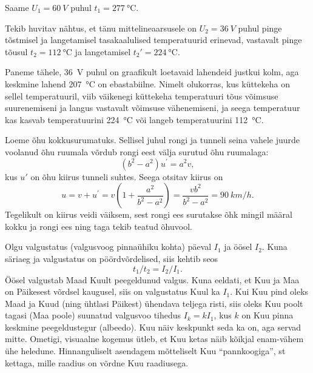 \documentclass[10pt]{article}
\begin{document}
{Saame $U_1 = \SI{60}{V}$ puhul $t_1 = \SI{277}{\degreeCelsius}$.

Tekib huvitav nähtus, et tänu mittelineaarsusele on $U_2 = \SI{36}{V}$ puhul pinge tõstmisel ja langetamisel tasakaalulised temperatuurid erinevad, vastavalt pinge tõusul $t_2 = \SI{112}{\degreeCelsius}$ ja langetamisel $t_2' = \SI{224}{\degreeCelsius}$.

Paneme tähele, \SI{36}{V} puhul on graafikult loetavaid lahendeid justkui kolm, aga keskmine lahend \SI{207}{\degreeCelsius} on ebastabiilne. Nimelt olukorras, kus küttekeha on sellel temperatuuril, viib väikenegi küttekeha temperatuuri tõus võimsuse suurenemiseni ja langus vastavalt võimsuse vähenemiseni, ja seega temperatuur kas kasvab temperatuurini \SI{224}{\degreeCelsius} või langeb temperatuurini \SI{112}{\degreeCelsius}.
\probend
\newpage
\bigskip


\solu
Loeme õhu kokkusurumatuks. Sellisel juhul rongi ja tunneli seina vahele juurde
voolanud õhu ruumala võrdub rongi eest välja surutud õhu ruumalaga:
\[
\left(b^{2}-a^{2}\right) u^{\prime}=a^{2} v,
\]
kus $u'$ on õhu kiirus tunneli suhtes. Seega otsitav kiirus on
\[
u=v+u^{\prime}=v\left(1+\frac{a^{2}}{b^{2}-a^{2}}\right)=\frac{v b^{2}}{b^{2}-a^{2}}=\SI{90}{km/h}.
\]
Tegelikult on kiirus veidi väiksem, sest rongi ees surutakse õhk mingil määral kokku ja rongi ees ning taga tekib teatud õhuvool.
\probend
\bigskip


\solu
Olgu valgustatus (valgusvoog pinnaühiku kohta) päeval $I_1$ ja öösel $I_2$. Kuna säriaeg ja valgustatus on pöördvõrdelised, siis kehtib seos
\[
t_1/t_2 = I_2/I_1.
\]
Öösel valgustab Maad Kuult peegeldunud valgus. Kuna eeldati, et Kuu ja Maa on Päikesest võrdsel kaugusel, siis on valgustatus Kuul ka $I_1$. Kui Kuu pind oleks Maad ja Kuud (ning ühtlasi Päikest) ühendava teljega risti, siis oleks Kuu poolt tagasi (Maa poole) suunatud valgusvoo tihedus $I_k = kI_1$, kus $k$ on Kuu pinna keskmine peegeldustegur (albeedo). Kuu näiv keskpunkt seda ka on, aga servad mitte. Ometigi, visuaalne kogemus ütleb, et Kuu ketas näib kõikjal enam-vähem ühe heledune. Hinnanguliselt asendagem mõtteliselt Kuu \enquote{pannkoogiga}, st kettaga, mille raadius on võrdne Kuu raadiusega.

}
\end{document}
